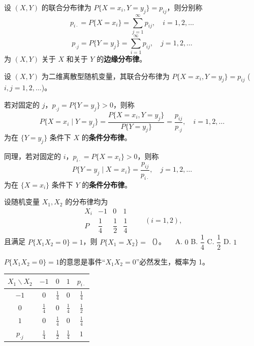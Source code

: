 \documentclass[lang=cn,11pt]{elegantbook}
\begin{document}
\begin{definition}[边缘分布律] \label{def:marginal-pm}
设 $(X,Y)$ 的联合分布律为 $P\{X = x_i, Y = y_j\} = p_{ij}$，则分别称
\[
p_{i\cdot} = P\{X = x_i\} = \sum_{j=1}^{\infty}p_{ij}, \quad i = 1,2,\dots
\]
\[
p_{\cdot j} = P\{Y = y_j\} = \sum_{i=1}^{\infty}p_{ij}, \quad j = 1,2,\dots
\]
为 $(X,Y)$ 关于 $X$ 和关于 $Y$ 的\textbf{边缘分布律}。
\end{definition}


\begin{definition}[条件分布律] \label{def:conditional-pm}
设 $(X,Y)$ 为二维离散型随机变量，其联合分布律为 $P\{X = x_i, Y = y_j\} = p_{ij}$ ($i,j = 1,2,\dots$)。

若对固定的 $j$，$p_{\cdot j} = P\{Y = y_j\} > 0$，则称
\[
P\{X = x_i \mid Y = y_j\} = \frac{P\{X = x_i, Y = y_j\}}{P\{Y = y_j\}} = \frac{p_{ij}}{p_{\cdot j}}, \quad i = 1,2,\dots
\]
为在 $\{Y = y_j\}$ 条件下 $X$ 的\textbf{条件分布律}。

同理，若对固定的 $i$，$p_{i\cdot} = P\{X = x_i\} > 0$，则称
\[
P\{Y = y_j \mid X = x_i\} = \frac{p_{ij}}{p_{i\cdot}}, \quad j = 1,2,\dots
\]
为在 $\{X = x_i\}$ 条件下 $Y$ 的\textbf{条件分布律}。
\end{definition}

\begin{exercise}\label{exer:src-2008-probstat-2a-i-01}
设随机变量 \(X_1,X_2\) 的分布律均为
\[
\begin{array}{c|ccc}
X_i&-1&0&1\\
\hline
P&\dfrac14&\dfrac12&\dfrac14
\end{array}
\qquad (i=1,2),
\]
且满足 \(P\{X_1X_2=0\}=1\)，则 \(P\{X_1=X_2\}=\)（\quad）。~~
A. \(0\)\quad
B. \(\dfrac14\)\quad
C. \(\dfrac12\)\quad
D. \(1\)
\end{exercise}
\begin{solution}
\(P\{X_1X_2=0\}=1\)的意思是事件“\(X_1X_2=0\)”必然发生，概率为 1。
\begin{center}
\begin{tabular}{c|ccc|c}
\toprule
$X_1 \backslash X_2$ & $-1$ & $0$ & $1$ & $p_{i\cdot}$ \\
\midrule
$-1$ & $0$ & $\frac{1}{4}$ & $0$ & $\frac{1}{4}$ \\
$0$ & $\frac{1}{4}$ & $0$ & $\frac{1}{4}$ & $\frac{1}{2}$ \\
$1$ & $0$ & $\frac{1}{4}$ & $0$ & $\frac{1}{4}$ \\
\midrule
$p_{\cdot j}$ & $\frac{1}{4}$ & $\frac{1}{2}$ & $\frac{1}{4}$ & $1$ \\
\bottomrule
\end{tabular}
\end{center}
\end{solution}
\end{document}
